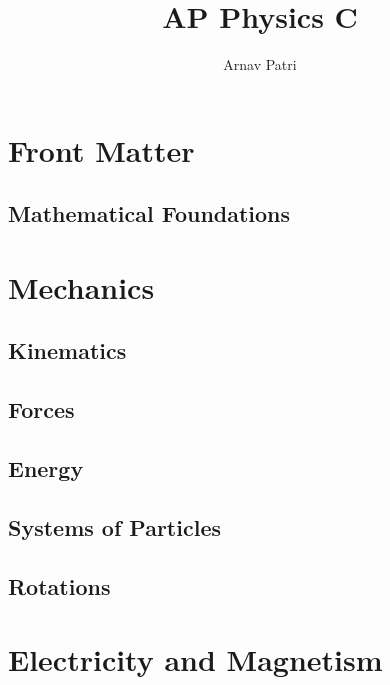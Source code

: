\documentclass[12pt, A4]{report}
\title{AP Physics C}
\author{Arnav Patri}
\begin{document}
	\maketitle
	\tableofcontents
	\part{Front Matter}
		\chapter{Mathematical Foundations}
			
	\part{Mechanics}
		\chapter{Kinematics}
			
		\chapter{Forces}
			
		\chapter{Energy}
			
		\chapter{Systems of Particles}
			
		\chapter{Rotations}
			
	\part{Electricity and Magnetism}
\end{document}

